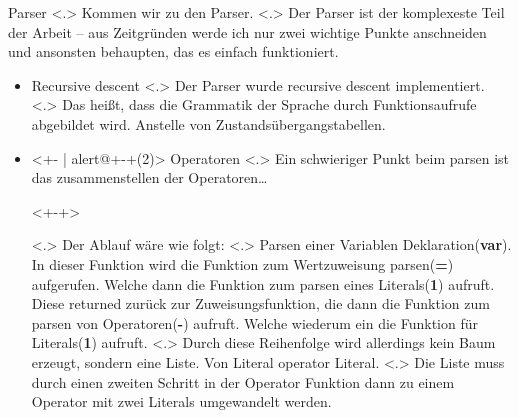   \begin{frame}{Parser}
    \pause
        \note[item]<.>{
          Kommen wir zu den Parser.
        }
        \note[item]<.>{
          Der Parser ist der komplexeste Teil der Arbeit -- aus Zeitgründen werde ich nur zwei wichtige Punkte anschneiden und ansonsten behaupten, das es einfach funktioniert.
        }
    \begin{itemize}[<+- | alert@+>]
      \item
        Recursive descent
            \note[item]<.>{
              Der Parser wurde recursive descent implementiert.
            }
            \note[item]<.>{
              Das heißt, dass die Grammatik der Sprache durch Funktionsaufrufe abgebildet wird. Anstelle von Zustandsübergangstabellen.
            }

      \item<+- | alert@+-+(2)>
        Operatoren
            \note[item]<.>{
              Ein schwieriger Punkt beim parsen ist das zusammenstellen der Operatoren\ldots
            }

          \begin{uncoverenv}<+-+>%
          \end{uncoverenv}
            \note[item]<.>{
              Der Ablauf wäre wie folgt:
            }
            \note[item]<.>{
              Parsen einer Variablen Deklaration(\textbf{var}). In dieser Funktion wird die Funktion zum Wertzuweisung parsen(\textbf{=}) aufgerufen. Welche dann die Funktion zum parsen eines Literals(\textbf{1}) aufruft. Diese returned zurück zur Zuweisungsfunktion, die dann die Funktion zum parsen von Operatoren(\textbf{-}) aufruft. Welche wiederum ein die Funktion für Literals(\textbf{1}) aufruft.
            }
            \note[item]<.>{
              Durch diese Reihenfolge wird allerdings kein Baum erzeugt, sondern eine Liste. Von Literal operator Literal.
            }
            \note[item]<.>{
              Die Liste muss durch einen zweiten Schritt in der Operator Funktion dann zu einem Operator mit zwei Literals umgewandelt werden.
            }


\end{itemize}
\end{frame}
